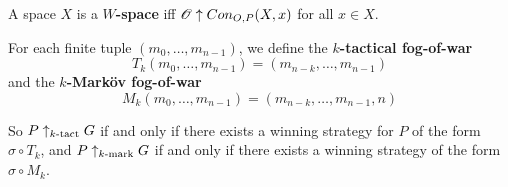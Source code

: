 \begin{definition}
  A space $X$ is a \textbf{$W$-space} iff $\mathscr{O}\uparrow Con_{O,P}(X,x)$ for all $x\in X$.
\end{definition}








\begin{definition}
  For each finite tuple $(m_0,\dots,m_{n-1})$, we define the \textbf{$k$-tactical fog-of-war}
    \[
      T_k(m_0,\dots,m_{n-1})=(m_{n-k},\dots,m_{n-1})
    \]
  and the \textbf{$k$-Mark\"ov fog-of-war}
    \[
      M_k(m_0,\dots,m_{n-1})=(m_{n-k},\dots,m_{n-1},n)
    \]

  So $P\uparrow_{k\text{-tact}}G$ if and only if there exists a winning strategy for $P$ of the form $\sigma\circ T_k$, and $P\uparrow_{k\text{-mark}}G$ if and only if there exists a winning strategy of the form $\sigma\circ M_k$.
\end{definition}

